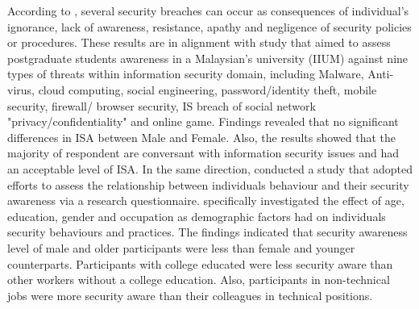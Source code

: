 According to \citet{Safa2015}, several security breaches can occur as consequences of individual's ignorance, lack of awareness, resistance, apathy and negligence of security policies or procedures. 
These results are in alignment with  \citet{Hamid2014} study that aimed to assess postgraduate students awareness in a Malaysian's university (IIUM) against nine types of threats within information security domain, including Malware, Anti-virus, cloud computing, social engineering, password/identity theft, mobile security, firewall/ browser security, IS breach of social network "privacy/confidentiality" and online game. Findings revealed that no significant differences in ISA between Male and Female. Also, the results showed that the majority of respondent are conversant with information security issues and had an acceptable level of ISA. 
In the same direction, \citet{Grant2010} conducted a study that adopted \citet{Katz2005} efforts to assess the relationship between individuals behaviour and their security awareness via a research questionnaire. \citet{Grant2010} specifically investigated the effect of age, education, gender and occupation as demographic factors had on individuals security behaviours and practices. The findings indicated that security awareness level of male and older participants were less than female and younger counterparts. Participants with college educated were less security aware than other workers without a college education. Also, participants in non-technical jobs were more security aware than their colleagues in technical positions. 


 

